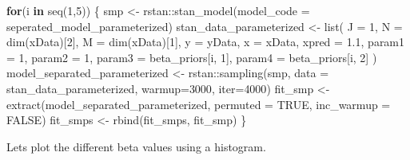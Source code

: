 \documentclass[
]{article}
\newenvironment{Shaded}{\begin{snugshade}}{\end{snugshade}}
\newcommand{\AttributeTok}[1]{\textcolor[rgb]{0.77,0.63,0.00}{#1}}
\newcommand{\ConstantTok}[1]{\textcolor[rgb]{0.00,0.00,0.00}{#1}}
\newcommand{\ControlFlowTok}[1]{\textcolor[rgb]{0.13,0.29,0.53}{\textbf{#1}}}
\newcommand{\DecValTok}[1]{\textcolor[rgb]{0.00,0.00,0.81}{#1}}
\newcommand{\FloatTok}[1]{\textcolor[rgb]{0.00,0.00,0.81}{#1}}
\newcommand{\FunctionTok}[1]{\textcolor[rgb]{0.00,0.00,0.00}{#1}}
\newcommand{\NormalTok}[1]{#1}
\newcommand{\OtherTok}[1]{\textcolor[rgb]{0.56,0.35,0.01}{#1}}
\newcommand{\SpecialCharTok}[1]{\textcolor[rgb]{0.00,0.00,0.00}{#1}}
\begin{document}
\begin{Shaded}
\begin{Highlighting}[]
\ControlFlowTok{for}\NormalTok{(i }\ControlFlowTok{in} \FunctionTok{seq}\NormalTok{(}\DecValTok{1}\NormalTok{,}\DecValTok{5}\NormalTok{)) \{}
\NormalTok{  smp }\OtherTok{\textless{}{-}}\NormalTok{ rstan}\SpecialCharTok{::}\FunctionTok{stan\_model}\NormalTok{(}\AttributeTok{model\_code =}\NormalTok{ seperated\_model\_parameterized)}
\NormalTok{  stan\_data\_parameterized }\OtherTok{\textless{}{-}} \FunctionTok{list}\NormalTok{(}
      \AttributeTok{J =} \DecValTok{1}\NormalTok{,}
      \AttributeTok{N =} \FunctionTok{dim}\NormalTok{(xData)[}\DecValTok{2}\NormalTok{],}
      \AttributeTok{M =} \FunctionTok{dim}\NormalTok{(xData)[}\DecValTok{1}\NormalTok{],}
      \AttributeTok{y =}\NormalTok{ yData,}
      \AttributeTok{x =}\NormalTok{ xData,}
      \AttributeTok{xpred =} \FloatTok{1.1}\NormalTok{,}
      \AttributeTok{param1 =} \DecValTok{1}\NormalTok{,}
      \AttributeTok{param2 =} \DecValTok{1}\NormalTok{,}
      \AttributeTok{param3 =}\NormalTok{ beta\_priors[i, }\DecValTok{1}\NormalTok{],}
      \AttributeTok{param4 =}\NormalTok{ beta\_priors[i, }\DecValTok{2}\NormalTok{]}
\NormalTok{  )}
\NormalTok{  model\_separated\_parameterized }\OtherTok{\textless{}{-}}\NormalTok{ rstan}\SpecialCharTok{::}\FunctionTok{sampling}\NormalTok{(smp, }
              \AttributeTok{data =}\NormalTok{ stan\_data\_parameterized, }\AttributeTok{warmup=}\DecValTok{3000}\NormalTok{, }\AttributeTok{iter=}\DecValTok{4000}\NormalTok{)}
\NormalTok{  fit\_smp }\OtherTok{\textless{}{-}} \FunctionTok{extract}\NormalTok{(model\_separated\_parameterized, }
                     \AttributeTok{permuted =} \ConstantTok{TRUE}\NormalTok{, }\AttributeTok{inc\_warmup =} \ConstantTok{FALSE}\NormalTok{)}
\NormalTok{  fit\_smps }\OtherTok{\textless{}{-}} \FunctionTok{rbind}\NormalTok{(fit\_smps, fit\_smp)}
\NormalTok{\}}
\end{Highlighting}
\end{Shaded}

Lets plot the different beta values using a histogram.
\end{document}
